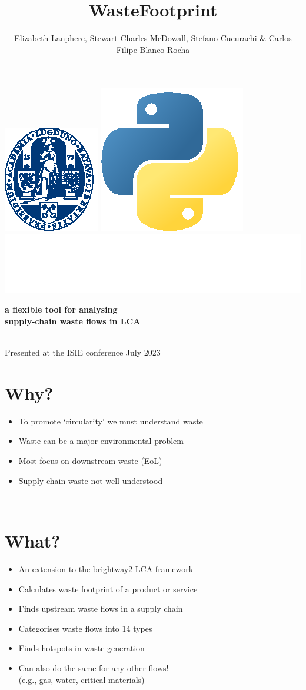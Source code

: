 \documentclass[a0paper,fleqn]{betterposter}
\begin{document}
{{        \includegraphics[height=0.1\textwidth]{img/logoUL_white}
        \includegraphics[height=0.07\textwidth]{img/python}
        \includegraphics[height=0.07\textwidth]{img/brightway}
    }
    }{

    \title{WasteFootprint}
    {\selectfont\textbf{a flexible tool for analysing\\ supply-chain waste flows in LCA}}\\

    \vspace{10pt}
    \author{Elizabeth Lanphere, Stewart Charles McDowall, Stefano Cucurachi \& Carlos Filipe Blanco Rocha}
    \vspace{30pt}
    \\
    {\fontsize{30}{30}\selectfont Presented at the ISIE conference July 2023}

    \section{Why?}
    \begin{itemize}
        \item To promote `circularity' we must understand waste  
        \item Waste can be a major environmental problem
        \item Most focus on downstream waste (EoL)
        \item Supply-chain waste not well understood
    \end{itemize}\\

    \section{What?}
    \begin{itemize}
    \item An extension to the brightway2 LCA framework
    \item Calculates waste footprint of a product or service
    \item Finds upstream waste flows in a supply chain
    \item Categorises waste flows into 14 types
    \item Finds hotspots in waste generation
    \item Can also do the same for any other flows! \\(e.g., gas, water, critical materials)
    \end{itemize}\\

}
\end{document}
